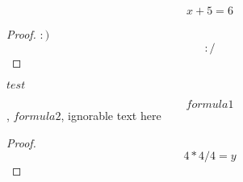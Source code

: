 \documentclass[11pt]{article}
\begin{document}
\begin{theorem}
\begin{equation}
x+5=6
\end{equation}
\end{theorem}

\begin{theorem}\end{theorem}

\begin{proof}
$:)$
$$:/$$
\end{proof}

\begin{lemma}
$test$
\end{lemma}

\begin{lemma}$$formula1$$, $formula2$, ignorable text here\end{lemma}

\begin{proof}
\begin{equation}
4*4/4=y
\end{equation}
\end{proof}
\end{document}
